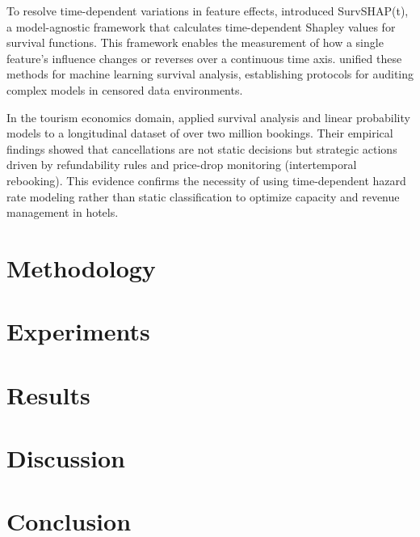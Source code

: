 \documentclass[pdflatex,sn-mathphys-ay]{sn-jnl}%
\theoremstyle{thmstyleone}%
\theoremstyle{thmstyletwo}%
\theoremstyle{thmstylethree}%
\begin{document}
To resolve time-dependent variations in feature effects, \cite{krzyzinski2023survshapt} introduced SurvSHAP(t), a model-agnostic framework that calculates time-dependent Shapley values for survival functions. This framework enables the measurement of how a single feature's influence changes or reverses over a continuous time axis. \cite{langbein2025interpretable} unified these methods for machine learning survival analysis, establishing protocols for auditing complex models in censored data environments.

In the tourism economics domain, \cite{mir2026decoding} applied survival analysis and linear probability models to a longitudinal dataset of over two million bookings. Their empirical findings showed that cancellations are not static decisions but strategic actions driven by refundability rules and price-drop monitoring (intertemporal rebooking). This evidence confirms the necessity of using time-dependent hazard rate modeling rather than static classification to optimize capacity and revenue management in hotels.

\section{Methodology}
\label{sec:methodology}

\section{Experiments}
\label{sec:experiments}

\section{Results}
\label{sec:results}

\section{Discussion}
\label{sec:discussion}

\section{Conclusion}
\label{sec:conclusion}

\backmatter
\end{document}
